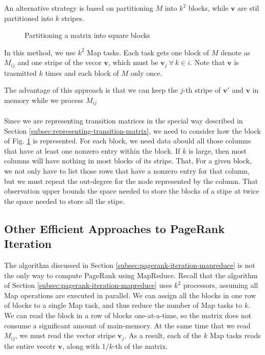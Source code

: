 An alternative strategy is based on partitioning $M$ into $k^2$ blocks, while $\textbf{v}$ are stil partitioned into $k$ stripes.

\begin{figure}[H]
\centering
\scalebox{1}{
    
}
\caption{Partitioning a matrix into square blocks}
\label{fig:partitioned-matrix}
\end{figure}

In this method, we use $k^2$ Map tasks. Each task gets one block of $M$ denote as $M_{ij}$ and one stripe of the vecor $\textbf{v}$, which must be $\textbf{v}_j \ \forall \ k \in  i$. Note that $\textbf{v}$ is trasmitted $k$ times and each block of $M$ only once.

The advantage of this approach is that we can keep the $j$-th stripe of $\textbf{v}'$ and $\textbf{v}$ in memory while we process $M_{ij}$\\
\\
Since we are representing transition matrices in the special way described in Section \ref{subsec:representing-transition-matrix}, we need to consider how the block of Fig. \ref{fig:partitioned-matrix} is represented. For each block, we need data abould all those columns that have at least one nonzero entry within the block. If $k$ is large, then most columns will have nothing in most blocks of its stripe. That, For a given block, we not only have to list those rows that have a nonzero entry for that column, but we must repeat the out-degree for the node represented by the column. That observation upper bounds the space needed to store the blocks of a stipe at twice the space needed to store all the stipe. 

\subsection{Other Efficient Approaches to PageRank Iteration}\label{subsec:other-efficient-approaches-pagerank-iteration}

The algorithm discussed in Section \ref{subsec:pagerank-iteration-mapreduce} is not the only way to compute PageRank using MapReduce. Recall that the algorithm of Section \ref{subsec:pagerank-iteration-mapreduce} uses $k^2$ processors, assuming all Map operations are executed in parallel. We can assign all the blocks in one row of blocks to a single Map task, and thus reduce the number of Map tasks to $k$. We can read the block in a row of blocks one-at-a-time, so the matrix does not consume a significant amount of main-memory. At the same time that we read $M_{ij}$, we must read the vector stripe $\textbf{v}_j$. As a result, each of the $k$ Map tasks reads the entire vecotr $\textbf{v}$, along with $1/k$-th of the matrix.

